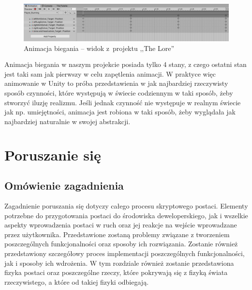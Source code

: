 \documentclass[oneside,polski,logo]{amuthesis}
\begin{document}
\begin{figure}[h]
	\centering
	\includegraphics[width=13cm]{images/kozubal/runningAnimation.jpg}
	\caption{Animacja biegania – widok z~projektu ,,The Lore''}
\end{figure}

Animacja biegania w naszym projekcie posiada tylko 4 stany, z czego ostatni stan jest taki sam jak pierwszy w celu zapętlenia animacji. W praktyce więc animowanie w Unity to próba przedstawienia w jak najbardziej rzeczywisty sposób czynności, które występują w świecie codziennym w taki sposób, żeby stworzyć iluzję realizmu. Jeśli jednak czynność nie występuje w realnym świecie jak np. umiejętności, animacja jest robiona w taki sposób, żeby wyglądała jak najbardziej naturalnie w swojej abstrakcji.

\section{Poruszanie się}
\subsection{Omówienie zagadnienia}
Zagadnienie poruszania się dotyczy całego procesu skryptowego postaci. Elementy potrzebne do przygotowania postaci do środowiska deweloperskiego, jak i wszelkie aspekty wprowadzenia postaci w ruch oraz jej reakcje na wejście wprowadzane przez użytkownika. Przedstawione zostaną problemy związane z tworzeniem poszczególnych funkcjonalności oraz sposoby ich rozwiązania. Zostanie również przedstawiony szczegółowy proces implementacji poszczególnych funkcjonalności, jak i sposoby ich wdrożenia. W tym rozdziale również zostanie przedstawiona fizyka postaci oraz poszczególne rzeczy, które pokrywają się z fizyką świata rzeczywistego, a które od takiej fizyki odbiegają.
\end{document}
